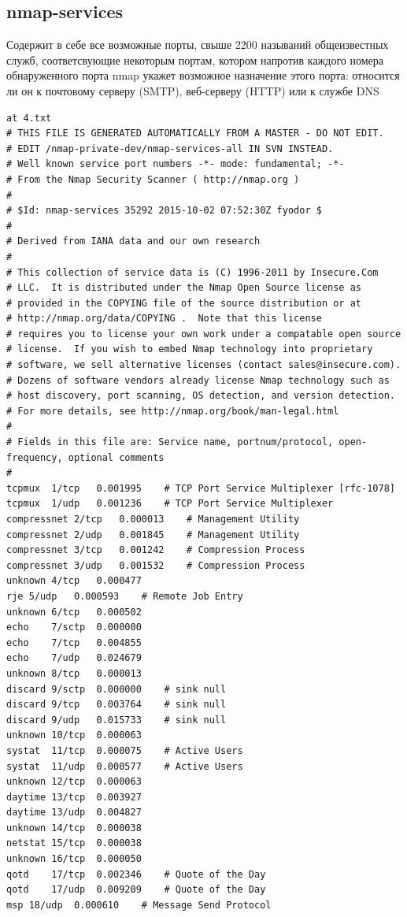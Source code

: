 \documentclass[12pt,a4paper]{report}
\begin{document}
\subsection*{nmap-services}
Содержит в себе все возможные порты, свыше 2200 называний общеизвестных служб, соответсвующие некоторым портам, котором
напротив каждого номера обнаруженного порта nmap укажет возможное назначение этого порта: относится ли он к почтовому серверу (SMTP), веб-серверу (HTTP) или к службе DNS
\begin{lstlisting}[breaklines]
at 4.txt 
# THIS FILE IS GENERATED AUTOMATICALLY FROM A MASTER - DO NOT EDIT.
# EDIT /nmap-private-dev/nmap-services-all IN SVN INSTEAD.
# Well known service port numbers -*- mode: fundamental; -*-
# From the Nmap Security Scanner ( http://nmap.org )
#
# $Id: nmap-services 35292 2015-10-02 07:52:30Z fyodor $
#
# Derived from IANA data and our own research
# 
# This collection of service data is (C) 1996-2011 by Insecure.Com
# LLC.  It is distributed under the Nmap Open Source license as
# provided in the COPYING file of the source distribution or at
# http://nmap.org/data/COPYING .  Note that this license
# requires you to license your own work under a compatable open source
# license.  If you wish to embed Nmap technology into proprietary
# software, we sell alternative licenses (contact sales@insecure.com).
# Dozens of software vendors already license Nmap technology such as
# host discovery, port scanning, OS detection, and version detection.
# For more details, see http://nmap.org/book/man-legal.html
#
# Fields in this file are: Service name, portnum/protocol, open-frequency, optional comments
#
tcpmux	1/tcp	0.001995	# TCP Port Service Multiplexer [rfc-1078]
tcpmux	1/udp	0.001236	# TCP Port Service Multiplexer
compressnet	2/tcp	0.000013	# Management Utility
compressnet	2/udp	0.001845	# Management Utility
compressnet	3/tcp	0.001242	# Compression Process
compressnet	3/udp	0.001532	# Compression Process
unknown	4/tcp	0.000477
rje	5/udp	0.000593	# Remote Job Entry
unknown	6/tcp	0.000502
echo	7/sctp	0.000000
echo	7/tcp	0.004855
echo	7/udp	0.024679
unknown	8/tcp	0.000013
discard	9/sctp	0.000000	# sink null
discard	9/tcp	0.003764	# sink null
discard	9/udp	0.015733	# sink null
unknown	10/tcp	0.000063
systat	11/tcp	0.000075	# Active Users
systat	11/udp	0.000577	# Active Users
unknown	12/tcp	0.000063
daytime	13/tcp	0.003927
daytime	13/udp	0.004827
unknown	14/tcp	0.000038
netstat	15/tcp	0.000038
unknown	16/tcp	0.000050
qotd	17/tcp	0.002346	# Quote of the Day
qotd	17/udp	0.009209	# Quote of the Day
msp	18/udp	0.000610	# Message Send Protocol

\end{lstlisting}
\end{document}
